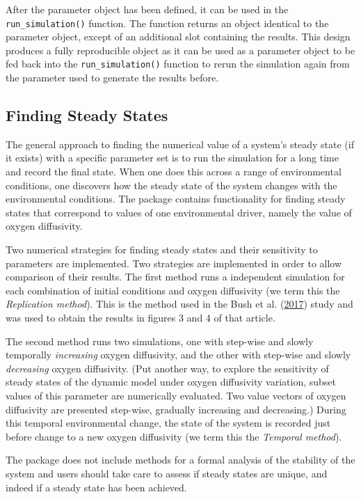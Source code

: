 \documentclass[
]{article}
\begin{document}
After the parameter object has been defined, it can be used in the \texttt{run\_simulation()} function. The function returns an object identical to the parameter object, except of an additional slot containing the results. This design produces a fully reproducible object as it can be used as a parameter object to be fed back into the \texttt{run\_simulation()} function to rerun the simulation again from the parameter used to generate the results before.

\hypertarget{finding-steady-states}{%
\subsection{Finding Steady States}\label{finding-steady-states}}

The general approach to finding the numerical value of a system's steady state (if it exists) with a specific parameter set is to run the simulation for a long time and record the final state. When one does this across a range of environmental conditions, one discovers how the steady state of the system changes with the environmental conditions. The package contains functionality for finding steady states that correspond to values of one environmental driver, namely the value of oxygen diffusivity.

Two numerical strategies for finding steady states and their sensitivity to parameters are implemented. Two strategies are implemented in order to allow comparison of their results. The first method runs a independent simulation for each combination of initial conditions and oxygen diffusivity (we term this the \emph{Replication method}). This is the method used in the Bush et al. (\protect\hyperlink{ref-Bush2017}{2017}) study and was used to obtain the results in figures 3 and 4 of that article.

The second method runs two simulations, one with step-wise and slowly temporally \emph{increasing} oxygen diffusivity, and the other with step-wise and slowly \emph{decreasing} oxygen diffusivity. (Put another way, to explore the sensitivity of steady states of the dynamic model under oxygen diffusivity variation, subset values of this parameter are numerically evaluated. Two value vectors of oxygen diffusivity are presented step-wise, gradually increasing and decreasing.) During this temporal environmental change, the state of the system is recorded just before change to a new oxygen diffusivity (we term this the \emph{Temporal method}).

The package does not include methods for a formal analysis of the stability of the system and users should take care to assess if steady states are unique, and indeed if a steady state has been achieved.
\end{document}
